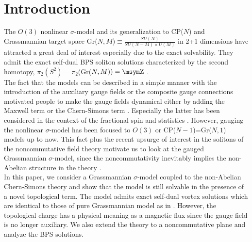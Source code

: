 \documentclass[a4paper,12pt]{article}
\def\Z{{\mathop{\hbox{\msym\char '132}}}}
\begin{document}
\section{Introduction}
The $O(3)$ nonlinear $\sigma$-model \cite{bela} and its generalization to CP($N$) and  Grassmannian target space
Gr($N,M$)$\equiv \frac{SU(N)}{SU(N-M)\times U(M)}$ in 2+1 dimensions \cite{zakr} have attracted a great deal of
interest \cite{haldane} especially due to the exact solvability. They admit the exact self-dual BPS soliton
solutions characterized by the second homotopy, $\pi_2(S^2)=\pi_2$(Gr($N,M))=\Z$ \cite{pere}.\\

The fact that the models can be described in a simple manner with the introduction of the auxiliary gauge fields or the composite gauge connections
motivated people to make the gauge fields dynamical either by adding the Maxwell term or the Chern-Simons term \cite{nard,rajeev}.  Especially the
latter has been considered in the context of the fractional spin and statistics \cite{wilz1}. However, gauging the nonlinear $\sigma$-model has been
 focused to $O(3)$ or CP($N-1$)=Gr($N,1$) models up to now. This fact plus the recent upsurge of interest in the solitons of the noncommutative
field theory \cite{harv} motivate us to look at the gauged Grassmannian $\sigma$-model, since the noncommutativity inevitably implies
 the non-Abelian structure in the theory \cite{bak}.\\

In this paper, we consider a Grassmannian $\sigma$-model coupled to the non-Abelian Chern-Simons theory \cite{jack} and show
that  the model is still solvable in the presence of a novel topological term. The model admits exact self-dual
vortex solutions which are identical to those of pure Grassmannian model as in \cite{zakr,macf}. However, the
topological charge has a physical meaning as a magnetic flux since the gauge field is no longer auxiliary. We also
extend the theory to a noncommutative plane and analyze the BPS solutions.\\
\end{document}

